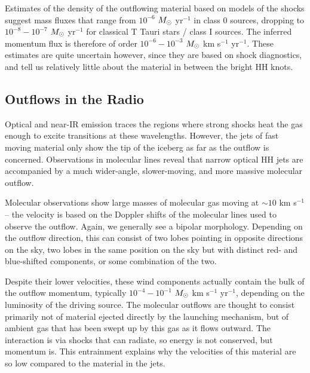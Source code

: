 Estimates of the density of the outflowing material based on models of the shocks suggest mass fluxes that range from $10^{-6}$ $M_{\odot}$ yr$^{-1}$ in class 0 sources, dropping to $10^{-8}-10^{-7}$ $M_{\odot}$ yr$^{-1}$ for classical T Tauri stars / class I sources. The inferred momentum flux is therefore of order $10^{-6}-10^{-3}$ $M_{\odot}$ km s$^{-1}$ yr$^{-1}$. These estimates are quite uncertain however, since they are based on shock diagnostics, and tell us relatively little about the material in between the bright HH knots.


\subsection{Outflows in the Radio}

Optical and near-IR emission traces the regions where strong shocks heat the gas enough to excite transitions at these wavelengths. However, the jets of fast moving material only show the tip of the iceberg as far as the outflow is concerned. Observations in molecular lines reveal that narrow optical HH jets are accompanied by a much wider-angle, slower-moving, and more massive molecular outflow. 

Molecular observations show large masses of molecular gas moving at $\sim 10$ km s$^{-1}$ -- the velocity is based on the Doppler shifts of the molecular lines used to observe the outflow. Again, we generally see a bipolar morphology. Depending on the outflow direction, this can consist of two lobes pointing in opposite directions on the sky, two lobes in the same position on the sky but with distinct red- and blue-shifted components, or some combination of the two.

Despite their lower velocities, these wind components actually contain the bulk of the outflow momentum, typically $10^{-4}-10^{-1}$ $M_{\odot}$ km s$^{-1}$ yr$^{-1}$, depending on the luminosity of the driving source. The molecular outflows are thought to consist primarily not of material ejected directly by the launching mechanism, but of ambient gas that has been swept up by this gas as it flows outward. The interaction is via shocks that can radiate, so energy is not conserved, but momentum is. This entrainment explains why the velocities of this material are so low compared to the material in the jets.


